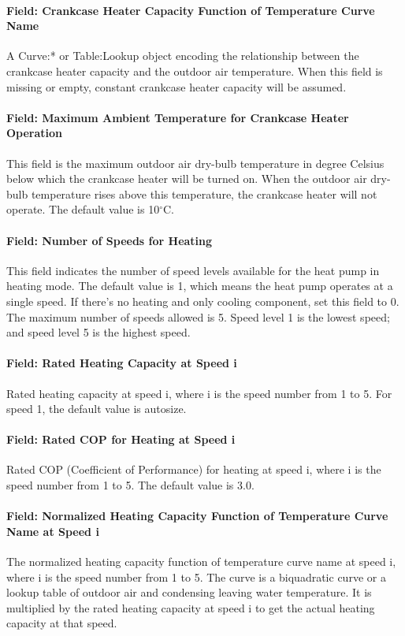 \paragraph{Field: Crankcase Heater Capacity Function of Temperature Curve Name}
A Curve:* or Table:Lookup object encoding the relationship between the crankcase
heater capacity and the outdoor air temperature. When this field is missing or
empty, constant crankcase heater capacity will be assumed.
\paragraph{Field: Maximum Ambient Temperature for Crankcase Heater Operation}
This field is the maximum outdoor air dry-bulb temperature in degree Celsius
below which the crankcase heater will be turned on. When the outdoor air dry-bulb
temperature rises above this temperature, the crankcase heater will not operate.
The default value is 10$^\circ$C.
\paragraph{Field: Number of Speeds for Heating} This field indicates the number
of speed levels available for the heat pump in heating mode. The default value
is 1, which means the heat pump operates at a single speed. If there's no
heating and only cooling component, set this field to 0. The maximum number of
speeds allowed is 5. Speed level 1 is the lowest speed; and speed level 5 is
the highest speed.
\paragraph{Field: Rated Heating Capacity at Speed i} Rated heating capacity at
speed i, where i is the speed number from 1 to 5. For speed 1, the default value
is autosize.
\paragraph{Field: Rated COP for Heating at Speed i} Rated COP (Coefficient of
Performance) for heating at speed i, where i is the speed number from 1 to 5.
The default value is 3.0.
\paragraph{Field: Normalized Heating Capacity Function of Temperature Curve Name
at Speed i} The normalized heating capacity function of temperature curve name
at speed i, where i is the speed number from 1 to 5. The curve is a biquadratic
curve or a lookup table of outdoor air and condensing leaving water temperature.
It is multiplied by the rated heating capacity at speed i to get the actual
heating capacity at that speed.
